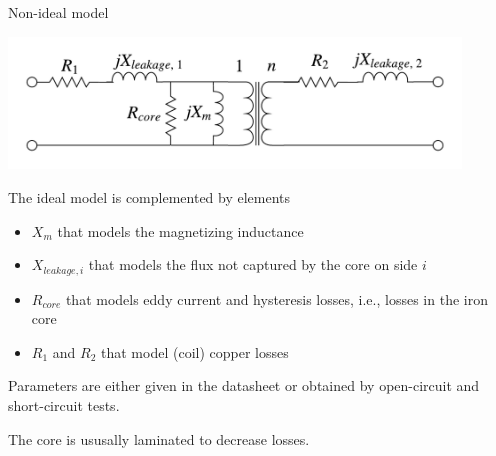 \begin{frame}[allowframebreaks]{Non-ideal model}

\begin{center}
   \includegraphics[width=0.9\textwidth]{images/non-ideal-transformer.png}
\end{center}
The ideal model is complemented by elements 
\begin{itemize}
    \item $X_m$ that models the magnetizing inductance
    \item $X_{leakage, i}$ that models the flux not captured by the core on side $i$
    \item $R_{core}$ that models eddy current and hysteresis losses, i.e., losses in the iron core
    \item $R_{1}$ and $R_{2}$ that model (coil) copper losses
\end{itemize}

Parameters are either given in the datasheet or obtained by open-circuit and short-circuit tests.

The core is ususally \alert{laminated}  to decrease losses.
\end{frame}

